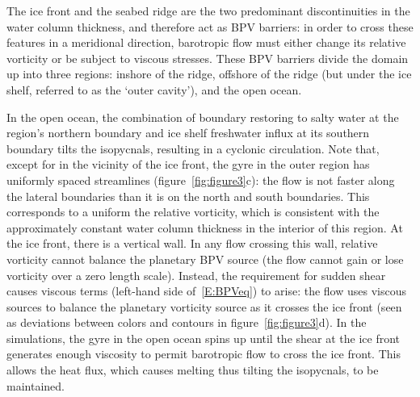 \documentclass[draft]{agujournal2019}
\begin{document}
The ice front and the seabed ridge are the two predominant discontinuities in the water column thickness, and therefore act as BPV barriers: in order to cross these features in a meridional direction, barotropic flow must either change its relative vorticity or be subject to viscous stresses. These BPV barriers divide the domain up into three regions: inshore of the ridge, offshore of the ridge (but under the ice shelf, referred to as the `outer cavity'), and the open ocean. 

In the open ocean, the combination of boundary restoring to salty water at the region's northern boundary and ice shelf freshwater influx at its southern boundary tilts the isopycnals, resulting in a cyclonic circulation. Note that, except for in the vicinity of the ice front, the gyre in the outer region has uniformly spaced streamlines (figure~\ref{fig:figure3}c): the flow is not faster along the lateral boundaries than it is on the north and south boundaries. This corresponds to a uniform the relative vorticity, which is consistent with the approximately constant water column thickness in the interior of this region. At the ice front, there is a vertical wall. In any flow crossing this wall, relative vorticity cannot balance the planetary BPV source (the flow cannot gain or lose vorticity over a zero length scale). Instead, the requirement for sudden shear causes viscous terms (left-hand side of~\eqref{E:BPVeq}) to arise: the flow uses viscous sources to balance the planetary vorticity source as it crosses the ice front (seen as deviations between colors and contours in figure~\ref{fig:figure3}d). In the simulations, the gyre in the open ocean spins up until the shear at the ice front generates enough viscosity to permit barotropic flow to cross the ice front. This allows the heat flux, which causes melting thus tilting the isopycnals, to be maintained.
\end{document}
